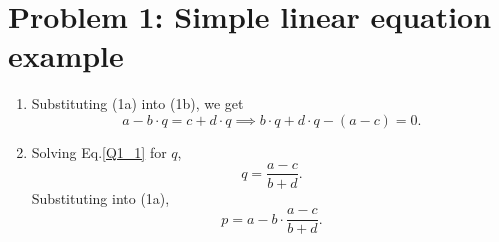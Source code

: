 \section*{Problem 1: Simple linear equation example}
\begin{enumerate}
\item Substituting (1a) into (1b), we get
        \begin{equation}\label{Q1_1}
        	a-b\cdot q=c+d\cdot q\implies
        	b\cdot q+d\cdot q-(a-c)=0.
        \end{equation}

\item Solving Eq.\eqref{Q1_1} for $q$,
        \begin{equation}
        	q=\frac{a-c}{b+d}.
        \end{equation}
      Substituting into (1a),
      	\begin{equation}
			p=a-b\cdot\frac{a-c}{b+d}.
		\end{equation}


\end{enumerate}
